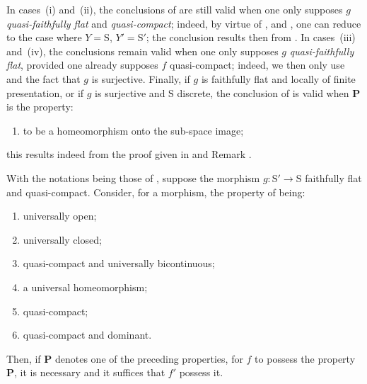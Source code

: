 \begin{remark}[2.6.3]
\label{IV.2.6.3}
In cases~(i) and~(ii), the conclusions of  are still
valid when one only supposes $g$ \emph{quasi-faithfully flat}  and \emph{quasi-compact};
indeed, by virtue of ,  and , one can reduce to the case
where $Y=\mathrm{S}$, $Y'=\mathrm{S}'$; the conclusion results then from . In cases~(iii) and~(iv),
the conclusions remain valid when one only supposes $g$ \emph{quasi-faithfully flat},
provided one already supposes $f$ quasi-compact; indeed, we then only use  and
the fact that $g$ is surjective. Finally, if $g$ is faithfully flat and locally of finite presentation,
or if $g$ is surjective and $\mathrm{S}$ discrete, the conclusion of  is valid when $\mathbf{P}$ is
the property:
\begin{enumerate}
  \item[(iii \emph{bis})] to be a homeomorphism onto the sub-space image;
\end{enumerate}
this results indeed from the proof given in  and Remark .
\end{remark}

\begin{corollary}[2.6.4]
\label{IV.2.6.4}
With the notations being those of , suppose the morphism
$g:\mathrm{S}'\to\mathrm{S}$ faithfully flat and quasi-compact. Consider, for a morphism, the property of being:
\begin{enumerate}[label=(\roman*)]
  \item universally open;
  \item universally closed;
  \item quasi-compact and universally bicontinuous;
  \item a universal homeomorphism;
  \item quasi-compact;
  \item quasi-compact and dominant.
\end{enumerate}
Then, if $\mathbf{P}$ denotes one of the preceding properties, for $f$ to possess the property $\mathbf{P}$, it is necessary
and it suffices that $f'$ possess it.
\end{corollary}

